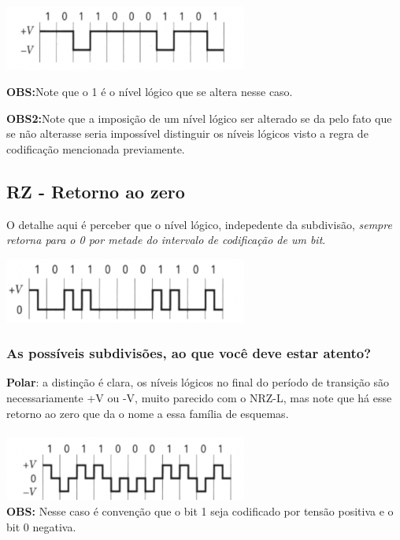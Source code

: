 \includegraphics[width=0.6\textwidth]{../assets/nrzm.png}\cite{dc}

\textbf{OBS:}Note que o 1 é o nível lógico que se altera nesse caso.

\textbf{OBS2:}Note que a imposição de um nível lógico ser alterado se da pelo fato que se não alterasse seria impossível distinguir os níveis lógicos visto a regra de codificação
mencionada previamente.

\subsection{RZ - Retorno ao zero}

O detalhe aqui é perceber que o nível lógico, indepedente da subdivisão, \textit{sempre retorna para o 0 por metade do intervalo de codificação de um bit}.

\includegraphics[width=0.6\textwidth]{../assets/rz.png}\cite{dc}


\subsubsection{As possíveis subdivisões, ao que você deve estar atento?}

\textbf{Polar}: a distinção é clara, os níveis lógicos no final do período de transição são necessariamente +V ou -V, muito parecido com o NRZ-L, mas note que há esse retorno ao
zero que da o nome a essa família de esquemas.
\\
\\
\includegraphics[width=0.6\textwidth]{../assets/polar-rz.png}\cite{dc}
\\
\textbf{OBS:} Nesse caso é convenção que o bit 1 seja codificado por tensão positiva e o bit 0 negativa.
\\

